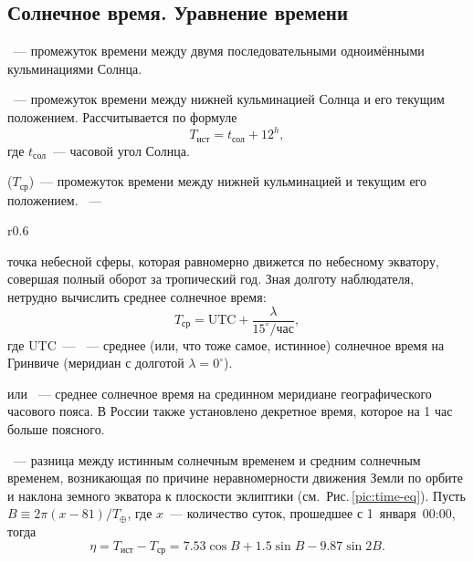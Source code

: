 \subsection{Солнечное время. Уравнение времени}
~--- промежуток времени между двумя последовательными одноимёнными кульминациями Солнца.

~--- промежуток времени между нижней кульминацией Солнца и его текущим положением. Рассчитывается по формуле
\begin{equation}
	T_{\text{ист}} = t_{\text{сол}}+12^h,
\end{equation}
где $t_{\text{сол}}$~--- часовой угол Солнца.

 ($T_\text{ср}$)~--- промежуток времени между нижней
кульминацией  и текущим его положением. ~--- 
\begin{wrapfigure}[14]{r}{0.6\tw}
	\centering
	\vspace{-1pc}
	\caption{График уравнения времени}
	\label{pic:time-eq}
\end{wrapfigure}
точка небесной сферы, которая равномерно движется по небесному экватору, совершая полный оборот за тропический год. Зная долготу наблюдателя, нетрудно вычислить среднее солнечное время:
\begin{equation*}
T_\text{ср} = \text{UTC} + \frac{\lambda}{15^\circ/\text{час}},
\end{equation*}
где UTC~--- ~--- среднее (или, что тоже самое, истинное) солнечное время на Гринвиче (меридиан с долготой $\lambda = 0^\circ$).

 или ~--- среднее солнечное время на срединном меридиане географического часового пояса. В России также установлено декретное время, которое на 1 час больше поясного.

~--- разница между истинным солнечным временем и средним солнечным временем, возникающая по причине неравномерности движения Земли по орбите и наклона земного экватора к плоскости эклиптики (см.~Рис.\,\ref{pic:time-eq}). Пусть $B \equiv 2 \pi (x - 81)/T_\oplus$, где $x$~--- количество суток, прошедшее с 1~января~00:00, тогда
\begin{equation}
\eta = T_{\text{ист}} - T_\text{ср} = 7.53 \cos B + 1.5 \sin B - 9.87 \sin 2 B.
\end{equation}